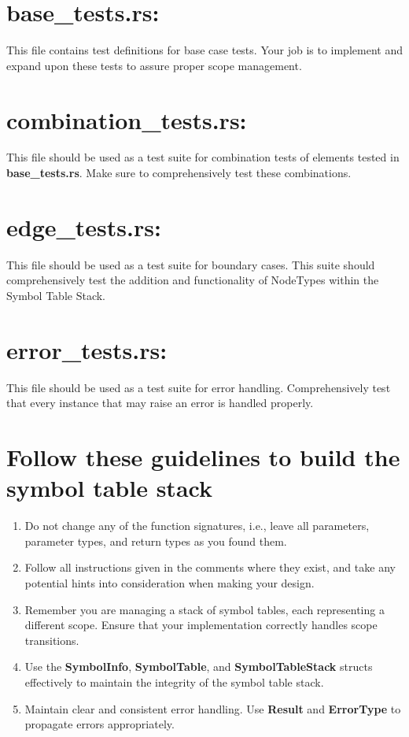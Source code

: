 \documentclass[
	12pt, %
]{fphw}
\begin{document}
\section*{base\_tests.rs:}
This file contains test definitions for base case tests. Your job is to implement and expand upon these tests to assure proper scope management. 

\section*{combination\_tests.rs:}
This file should be used as a test suite for combination tests of elements tested in \textbf{base\_tests.rs}. Make sure to comprehensively test these combinations. 

\section*{edge\_tests.rs:}
This file should be used as a test suite for boundary cases. This suite should comprehensively test the addition and functionality of NodeTypes within the Symbol Table Stack. 

\section*{error\_tests.rs:}
This file should be used as a test suite for error handling. Comprehensively test that every instance that may raise an error is handled properly. 

\pagebreak

\section*{Follow these guidelines to build the symbol table stack}

\begin{problem}
    \begin{enumerate}
        \item Do not change any of the function signatures, i.e., leave all parameters, parameter types, and return types as you found them.
        \item Follow all instructions given in the comments where they exist, and take any potential hints into consideration when making your design.
        \item Remember you are managing a stack of symbol tables, each representing a different scope. Ensure that your implementation correctly handles scope transitions.
        \item Use the \textbf{SymbolInfo}, \textbf{SymbolTable}, and \textbf{SymbolTableStack} structs effectively to maintain the integrity of the symbol table stack.
        \item Maintain clear and consistent error handling. Use \textbf{Result} and \textbf{ErrorType} to propagate errors appropriately.
    \end{enumerate}
\end{problem}
\end{document}
